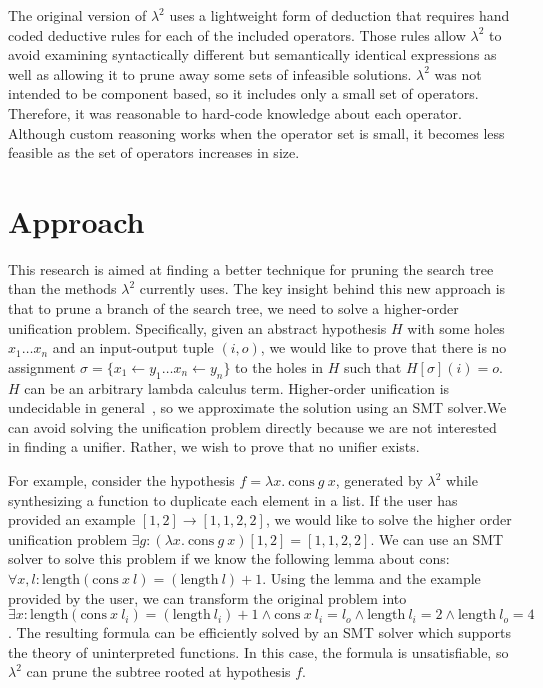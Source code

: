 \documentclass[11pt]{article}
\newcommand{\sys}{$\lambda^2$\xspace}
\begin{document}
The original version of \sys uses a lightweight form of deduction that
requires hand coded deductive rules for each of the included
operators. Those rules allow \sys to avoid examining syntactically
different but semantically identical expressions as well as allowing
it to prune away some sets of infeasible solutions. \sys was not
intended to be component based, so it includes only a small set of
operators. Therefore, it was reasonable to hard-code knowledge about
each operator. Although custom reasoning works when the operator set
is small, it becomes less feasible as the set of operators increases
in size.

\section{Approach}
\label{sec-3}

This research is aimed at finding a better technique for pruning the
search tree than the methods \sys currently uses. The key insight
behind this new approach is that to prune a branch of the search tree,
we need to solve a higher-order unification problem. Specifically,
given an abstract hypothesis $H$ with some holes $x_1 \dots x_n$ and
an input-output tuple $(i, o)$, we would like to prove that there is
no assignment
$\sigma = \{x_1 \leftarrow y_1 \dots x_n \leftarrow y_n\}$ to the
holes in $H$ such that $H[\sigma](i) = o$. $H$ can be an arbitrary
lambda calculus term. Higher-order unification is undecidable in
general~\cite{huet-undecidability}, so we approximate the solution
using an SMT solver.\@ We can avoid solving the unification problem
directly because we are not interested in finding a unifier. Rather,
we wish to prove that no unifier exists.

For example, consider the hypothesis $f = \lambda x.~\text{cons}~g~x$,
generated by \sys while synthesizing a function to duplicate each
element in a list. If the user has provided an example
$[1, 2] \rightarrow [1, 1, 2, 2]$, we would like to solve the higher
order unification problem
$\exists g: (\lambda x.~\text{cons}~g~x) [1, 2] = [1, 1, 2, 2]$. We
can use an SMT solver to solve this problem if we know the following
lemma about cons:
$\forall x, l: \text{length}(\text{cons}~x~l) = (\text{length}~l) +
1$.
Using the lemma and the example provided by the user, we can transform
the original problem into
\(\exists x : \text{length}(\text{cons}~x~l_i) = (\text{length}~l_i) +
1 \land \text{cons}~x~l_i = l_o \land \text{length}~l_i = 2 \land
\text{length}~l_o = 4\).
The resulting formula can be efficiently solved by an SMT solver which
supports the theory of uninterpreted functions. In this case, the
formula is unsatisfiable, so \sys can prune the subtree rooted at
hypothesis $f$.
\end{document}
